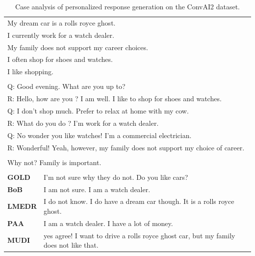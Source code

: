 
\begin{table}[ht]
\centering
\def\arraystretch{1.6}%
\begin{tabular}{|l|p{11cm}|}

\hline
\rowcolor{yellow}
\multicolumn{2}{|c|}{\textbf{Persona}} \\
\hline
\multicolumn{2}{|l|}{My dream car is a rolls royce ghost.} \\
\multicolumn{2}{|l|}{I currently work for a watch dealer.} \\
\multicolumn{2}{|l|}{My family does not support my career choices.} \\
\multicolumn{2}{|l|}{I often shop for shoes and watches.} \\
\multicolumn{2}{|l|}{I like shopping.} \\
\hline

\rowcolor{yellow}
\multicolumn{2}{|c|}{\textbf{Context}} \\
\hline
\multicolumn{2}{|l|}{Q: Good evening. What are you up to?} \\
\multicolumn{2}{|l|}{R: Hello, how are you ? I am well. I like to shop for shoes and watches.} \\
\multicolumn{2}{|l|}{Q: I don't shop much. Prefer to relax at home with my cow.} \\
\multicolumn{2}{|l|}{R: What do you do ? I'm work for a watch dealer.} \\
\multicolumn{2}{|l|}{Q: No wonder you like watches! I'm a commercial electrician.} \\
\multicolumn{2}{|l|}{R: Wonderful! Yeah, however, my family does not support my choice of career.} \\
\hline

\rowcolor{yellow}
\multicolumn{2}{|c|}{\textbf{Query}} \\
\hline
\multicolumn{2}{|l|}{Why not? Family is important.} \\

\hhline{|==|}
\rowcolor[RGB]{204,217,245}
\multicolumn{2}{|c|}{\textbf{Response}} \\
\hhline{|==|}
\textbf{GOLD} & I'm not sure why they do not. Do you like cars? \\
\textbf{BoB} & I am not sure. I am a watch dealer. \\
\textbf{LMEDR} & I do not know. I do have a dream car though. It is a rolls royce ghost. \\
\textbf{PAA} & I am a watch dealer. I have a lot of money. \\
\textbf{MUDI} & yes agree! I want to drive a rolls royce ghost car, but my family does not like that. \\

\hline
\end{tabular}
\caption{Case analysis of personalized response generation on the ConvAI2 dataset.}
\label{table:case_study_2}
\end{table}

